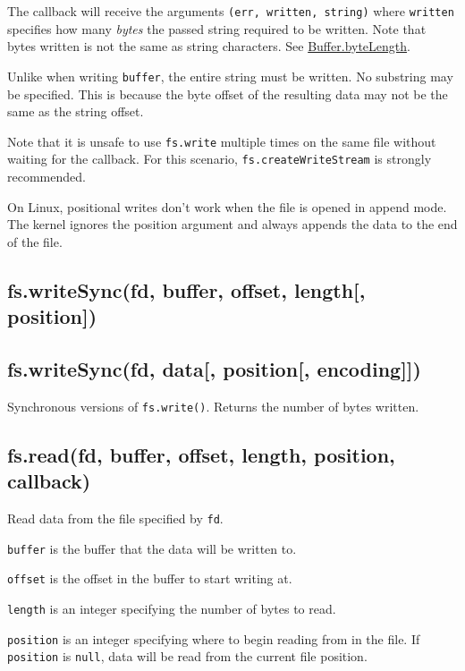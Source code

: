 The callback will receive the arguments \texttt{(err, written, string)}
where \texttt{written} specifies how many \emph{bytes} the passed string
required to be written. Note that bytes written is not the same as
string characters. See
\href{buffer.html\#buffer\_class\_method\_buffer\_bytelength\_string\_encoding}{Buffer.byteLength}.

Unlike when writing \texttt{buffer}, the entire string must be written.
No substring may be specified. This is because the byte offset of the
resulting data may not be the same as the string offset.

Note that it is unsafe to use \texttt{fs.write} multiple times on the
same file without waiting for the callback. For this scenario,
\texttt{fs.createWriteStream} is strongly recommended.

On Linux, positional writes don't work when the file is opened in append
mode. The kernel ignores the position argument and always appends the
data to the end of the file.

\subsection{fs.writeSync(fd, buffer, offset, length{[}, position{]})}

\subsection{fs.writeSync(fd, data{[}, position{[}, encoding{]}{]})}

Synchronous versions of \texttt{fs.write()}. Returns the number of bytes
written.

\subsection{fs.read(fd, buffer, offset, length, position, callback)}

Read data from the file specified by \texttt{fd}.

\texttt{buffer} is the buffer that the data will be written to.

\texttt{offset} is the offset in the buffer to start writing at.

\texttt{length} is an integer specifying the number of bytes to read.

\texttt{position} is an integer specifying where to begin reading from
in the file. If \texttt{position} is \texttt{null}, data will be read
from the current file position.

